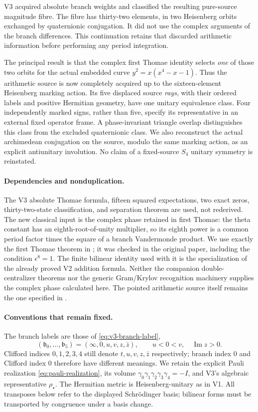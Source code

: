 \documentclass[11pt]{article}
\theoremstyle{definition}
\theoremstyle{remark}
\begin{document}
V3 acquired absolute branch weights and classified the resulting pure-source
magnitude fibre. The fibre has thirty-two elements, in two Heisenberg orbits
exchanged by quaternionic conjugation. It did not use the complex arguments
of the branch differences. This continuation retains that discarded
arithmetic information before performing any period integration.

The principal result is that the complex first Thomae identity selects
\emph{one} of those two orbits for the actual embedded curve
$y^2=x(x^4-x-1)$. Thus the arithmetic source is now completely acquired up to
the sixteen-element Heisenberg marking action. Its five displaced source
\emph{rays}, with their ordered labels and positive Hermitian geometry, have
one unitary equivalence class. Four independently marked signs, rather than
five, specify its representative in an external fixed operator frame. A
phase-invariant triangle overlap distinguishes this class from the excluded
quaternionic class. We also reconstruct the actual archimedean conjugation
on the source, modulo the same marking action, as an explicit antiunitary
involution. No claim of a fixed-source $S_4$ unitary symmetry is reinstated.

\paragraph{Dependencies and nonduplication.}
The V3 absolute Thomae formula, fifteen squared expectations, two exact
zeros, thirty-two-state classification, and separation theorem are used,
not rederived. The new classical input is the complex phase retained in
first Thomae: the theta constant has an eighth-root-of-unity multiplier, so
its eighth power is a common period factor times the square of a branch
Vandermonde product. We use exactly the first Thomae theorem in
\cite[Section 2.6, equation (13)]{BernatskaThomae}; it was checked in the
original paper, including the condition $\epsilon^8=1$. The finite
bilinear identity used with it is the specialization of the already proved
V2 addition formula. Neither the companion double-centralizer theorems nor
the generic Gram/Krylov recognition machinery supplies the complex phase
calculated here. The pointed arithmetic source itself remains the one
specified in \cite[\texttt{eq:v9-theta-source-ray}]{AD9}.

\paragraph{Conventions that remain fixed.}
The branch labels are those of \cref{eq:v3-branch-label},
\[
 (\mathfrak b_0,\ldots,\mathfrak b_5)=(\infty,0,u,v,z,\bar z),
 \qquad u<0<v,\quad\operatorname{Im}z>0.
\]
Clifford indices $0,1,2,3,4$ still denote $t,u,v,z,\bar z$ respectively;
branch index $0$ and Clifford index $0$ therefore have different meanings.
We retain the explicit Pauli realization \eqref{eq:pauli-realization}, its
volume $\gamma_0\gamma_1\gamma_2\gamma_3\gamma_4=-I$, and V3's algebraic
representative $\rho_\star$. The Hermitian metric is Heisenberg-unitary as
in V1. All transposes below refer to the displayed Schr\"odinger basis;
bilinear forms must be transported by congruence under a basis change.
\end{document}
